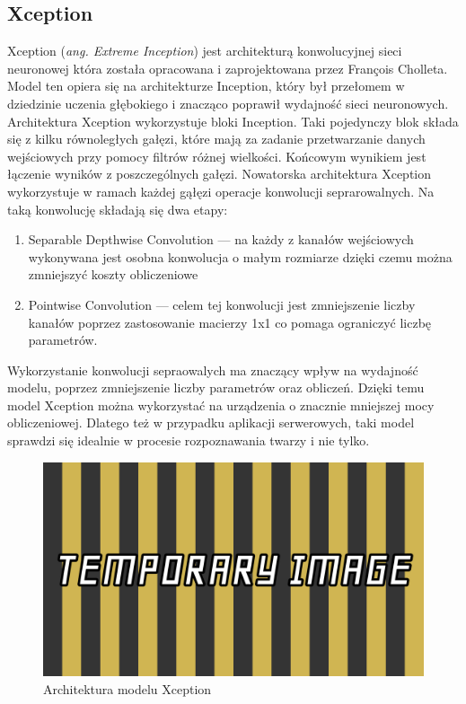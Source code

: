\subsection{Xception}
Xception (\emph{ang. Extreme Inception}) jest architekturą konwolucyjnej sieci neuronowej która została opracowana i zaprojektowana przez François Cholleta. Model ten opiera się na architekturze Inception, który był przełomem w dziedzinie uczenia głębokiego i znacząco poprawił wydajność sieci neuronowych. \\
Architektura Xception wykorzystuje bloki Inception. Taki pojedynczy blok składa się z kilku równoległych gałęzi, które mają za zadanie przetwarzanie danych wejściowych przy pomocy filtrów różnej wielkości. Końcowym wynikiem jest łączenie wyników z poszczególnych gałęzi. 
Nowatorska architektura Xception wykorzystuje w ramach każdej gąłęzi operacje konwolucji seprarowalnych. Na taką konwolucję składają się dwa etapy:
\begin{enumerate}
\item Separable Depthwise Convolution --- na każdy z kanałów wejściowych wykonywana jest osobna konwolucja o małym rozmiarze dzięki czemu można zmniejszyć koszty obliczeniowe
\item Pointwise Convolution --- celem tej konwolucji jest zmniejszenie liczby kanałów poprzez zastosowanie macierzy 1x1 co pomaga ograniczyć liczbę parametrów.
\end{enumerate}

Wykorzystanie konwolucji sepraowalych ma znaczący wpływ na wydajność modelu, poprzez zmniejszenie liczby parametrów oraz obliczeń. Dzięki temu model Xception można wykorzystać na urządzenia o znacznie mniejszej mocy obliczeniowej. Dlatego też w przypadku aplikacji serwerowych, taki model sprawdzi się idealnie w procesie rozpoznawania twarzy i nie tylko.

\begin{figure}[ht]
	\centering
		\includegraphics[width=1\linewidth]{imgs/temp.png}
	\caption{Architektura modelu Xception}
	\label{fig:xception-architektura}
\end{figure}

